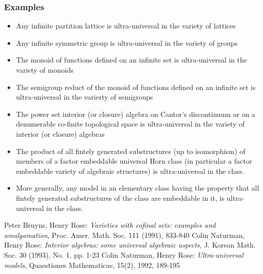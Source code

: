 \documentclass[12pt]{article}
\begin{document}
\subsubsection{Examples}

\begin{itemize}
\item Any infinite partition lattice is ultra-universal in the variety of lattices \cite{VC}
\item Any infinite symmetric group is ultra-universal in the variety of groups \cite{UM}
\item The monoid of functions defined on an infinite set is ultra-universal in the variety of monoids \cite{UM}
\item The semigroup reduct of the monoid of functions defined on an infinite set is ultra-universal in the varierty of semigroups \cite{UM}
\item The power set interior (or closure) algebra on Cantor's discontinuum or on a denumerable co-finite topological space is ultra-universal in the variety of interior (or closure) algebras \cite{IA}
\item The product of all fintely generated substructures (up to isomorphism) of members of a factor embeddable universal Horn class (in particular a factor embeddable variety of algebraic structures) is ultra-universal in the class. \cite{UM}
\item More generally, any model in an elementary class having the property that all fintely generated substructures of the class are embeddable in it, is ultra-universal in the class. \cite{UM}
\end{itemize}

\begin{thebibliography}{1}
 Peter Bruyns, Henry Rose: \emph{Varieties with cofinal sets: examples and amalgamation}, Proc. Amer. Math. Soc. 111 (1991), 833-840
 Colin Naturman, Henry Rose: \emph{Interior algebras: some universal algebraic aspects}, J. Korean Math. Soc. 30 (1993), No. 1, pp. 1-23
 Colin Naturman, Henry Rose: \emph{Ultra-universal models}, Quaestiones Mathematicae, 15(2), 1992, 189-195
\end{thebibliography}

\end{document}
